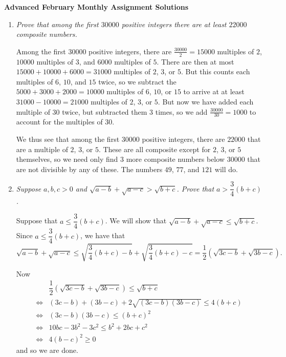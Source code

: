 \documentclass{article}
\begin{document}
\thispagestyle{empty}

\begin{center}
  \textbf{\Large Advanced February Monthly Assignment Solutions}
\end{center}

\vspace{12pt}

\begin{enumerate}[1.]

\vspace{24pt}
\item %
{\itshape Prove that among the first $30000$ positive integers there are at least $22000$ composite numbers.}

Among the first $30000$ positive integers, there are $\frac{30000}{2} = 15000$ multiples of $2$, $10000$ multiples of $3$, and $6000$ multiples of $5$. There are then at most $15000 + 10000 + 6000 = 31000$ multiples of $2$, $3$, or $5$. But this counts each multiples of $6$, $10$, and $15$ twice, so we subtract the $5000 + 3000 + 2000 = 10000$ multiples of $6$, $10$, or $15$ to arrive at at least $31000 - 10000 = 21000$ multiples of $2$, $3$, or $5$. But now we have added each multiple of $30$ twice, but subtracted them $3$ times, so we add $\frac{30000}{30} = 1000$ to account for the multiples of $30$.

We thus see that among the first $30000$ positive integers, there are $22000$ that are a multiple of $2$, $3$, or $5$. These are all composite except for $2$, $3$, or $5$ themselves, so we need only find $3$ more composite numbers below $30000$ that are not divisible by any of these. The numbers $49$, $77$, and $121$ will do.


\vspace{24pt}
\item %
{\itshape Suppose $a,b,c > 0$ and $\sqrt{a-b} +\sqrt{a-c} > \sqrt{b+c}$. Prove that $a > \dfrac{3}{4} (b+c)$.}

Suppose that $a \leq \dfrac{3}{4} (b + c)$. We will show that $\sqrt{a-b} +\sqrt{a-c} \leq \sqrt{b+c}$. Since $a \leq \dfrac{3}{4} (b + c)$, we have that
\[
	\sqrt{a-b} +\sqrt{a-c} \leq \sqrt{\frac{3}{4}(b + c) - b} + \sqrt{\frac{3}{4}(b + c) - c} = \frac{1}{2} \left(\sqrt{3c - b} + \sqrt{3b - c}\right).
\]

Now
\begin{align*}
	& \dfrac{1}{2} \left(\sqrt{3c - b} + \sqrt{3b - c}\right)  \leq \sqrt{b + c} \\
	\iff & (3c - b) + (3b - c) + 2\sqrt{(3c - b)(3b - c)}  \leq 4(b + c) \\
	\iff & (3c - b)(3b - c) \leq (b + c)^2 \\
	\iff & 10bc - 3b^2 - 3c^2 \leq b^2 + 2bc + c^2 \\
	\iff & 4(b - c)^2 \geq 0
\end{align*}
and so we are done.



\end{enumerate}
\end{document}
